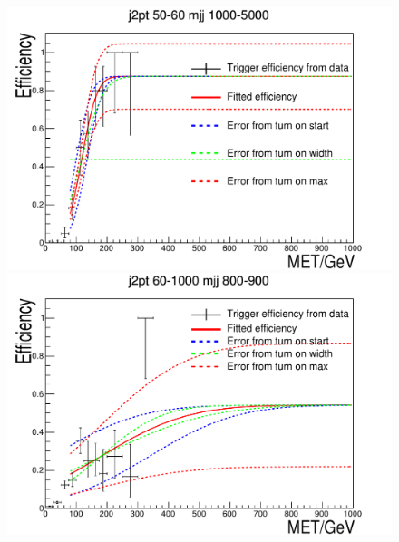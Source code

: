 \begin{figure}[h!]
\begin{center}
    \includegraphics[width=.6\largefigwidth]{plots/parked/trigfitplots/hData_MET_1D_35A.pdf}
    \includegraphics[width=.6\largefigwidth]{plots/parked/trigfitplots/hData_MET_1D_43A.pdf}


\end{center}
\end{figure}

